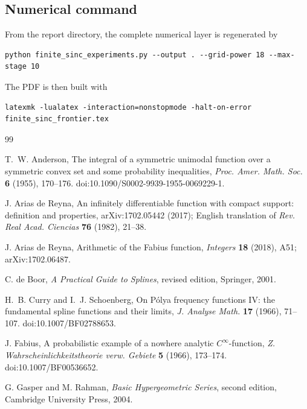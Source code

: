 \documentclass[11pt,oneside]{article}
\numberwithin{equation}{section}
\theoremstyle{definition}
\theoremstyle{remark}
\begin{document}
\subsection{Numerical command}

From the report directory, the complete numerical layer is regenerated by
\begin{lstlisting}[style=python]
python finite_sinc_experiments.py --output . --grid-power 18 --max-stage 10
\end{lstlisting}
The PDF is then built with
\begin{lstlisting}[style=python]
latexmk -lualatex -interaction=nonstopmode -halt-on-error finite_sinc_frontier.tex
\end{lstlisting}

\begin{thebibliography}{99}

T.~W. Anderson,
\newblock The integral of a symmetric unimodal function over a symmetric convex set and some probability inequalities,
\newblock \emph{Proc. Amer. Math. Soc.} \textbf{6} (1955), 170--176.
\newblock doi:10.1090/S0002-9939-1955-0069229-1.

J. Arias de Reyna,
\newblock An infinitely differentiable function with compact support: definition and properties,
\newblock arXiv:1702.05442 (2017); English translation of \emph{Rev. Real Acad. Ciencias} \textbf{76} (1982), 21--38.

J. Arias de Reyna,
\newblock Arithmetic of the Fabius function,
\newblock \emph{Integers} \textbf{18} (2018), A51; arXiv:1702.06487.

C. de Boor,
\newblock \emph{A Practical Guide to Splines}, revised edition,
\newblock Springer, 2001.

H.~B. Curry and I.~J. Schoenberg,
\newblock On P\'olya frequency functions IV: the fundamental spline functions and their limits,
\newblock \emph{J. Analyse Math.} \textbf{17} (1966), 71--107.
\newblock doi:10.1007/BF02788653.

J. Fabius,
\newblock A probabilistic example of a nowhere analytic $C^\infty$-function,
\newblock \emph{Z. Wahrscheinlichkeitstheorie verw. Gebiete} \textbf{5} (1966), 173--174.
\newblock doi:10.1007/BF00536652.

G. Gasper and M. Rahman,
\newblock \emph{Basic Hypergeometric Series}, second edition,
\newblock Cambridge University Press, 2004.


\end{thebibliography}
\end{document}
